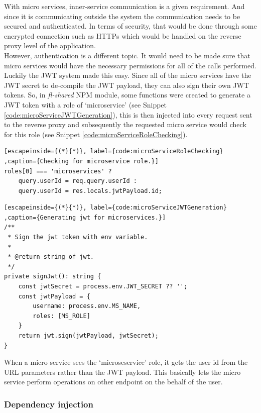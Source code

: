 \documentclass{article}
\newcommand{\vspaceconst}{-2ex}
\begin{document}
\begin{multicols}{2}
With micro services, inner-service communication is a given requirement. And since it is communicating outside the system the communication needs to be secured and authenticated. In terms of security, that would be done through some encrypted connection such as HTTPs which would be handled on the reverse proxy level of the application.\\
However, authentication is a different topic. It would need to be made sure that micro services would have the necessary permissions for all of the calls performed. Luckily the JWT system made this easy. Since all of the micro services have the JWT secret to de-compile the JWT payload, they can also sign their own JWT tokens. So, in \textit{fl-shared} NPM module, some functions were created to generate a JWT token with a role of `microservice' (see Snippet \ref{code:microServiceJWTGeneration}), this is then injected into every request sent to the reverse proxy and subsequently the requested micro service would check for this role (see Snippet \ref{code:microServiceRoleChecking}).\\

\begin{lstlisting}[escapeinside={(*}{*)}, label={code:microServiceRoleChecking} ,caption={Checking for microservice role.}]
roles[0] === 'microservices' ?
    query.userId = req.query.userId :
    query.userId = res.locals.jwtPayload.id;
\end{lstlisting}

\begin{lstlisting}[escapeinside={(*}{*)}, label={code:microServiceJWTGeneration} ,caption={Generating jwt for microservices.}]
/**
 * Sign the jwt token with env variable.
 *
 * @return string of jwt.
 */
private signJwt(): string {
    const jwtSecret = process.env.JWT_SECRET ?? '';
    const jwtPayload = {
        username: process.env.MS_NAME,
        roles: [MS_ROLE]
    }
    return jwt.sign(jwtPayload, jwtSecret);
}
\end{lstlisting}

When a micro service sees the `microseservice' role, it gets the user id from the URL parameters rather than the JWT payload. This basically lets the micro service perform operations on other endpoint on the behalf of the user.\\

\subsubsection{Dependency injection}
\vspace{\vspaceconst}


\end{multicols}
\end{document}
